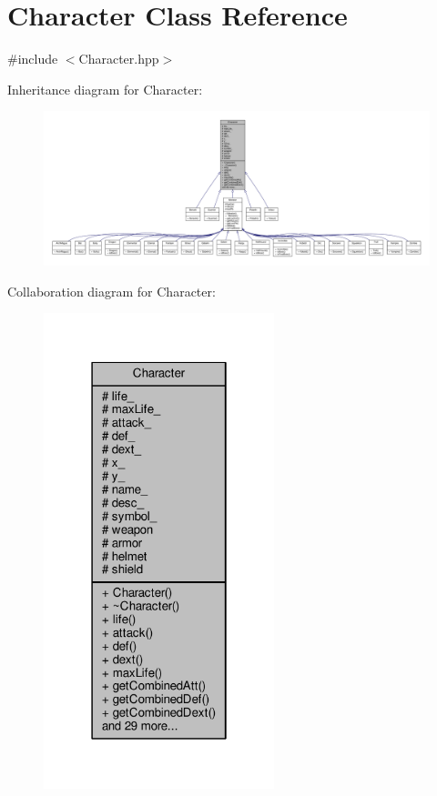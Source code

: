 \hypertarget{class_character}{\section{Character Class Reference}
\label{class_character}
}


{\ttfamily \#include $<$Character.\-hpp$>$}



Inheritance diagram for Character\-:
\nopagebreak
\begin{figure}[H]
\begin{center}
\leavevmode
\includegraphics[width=350pt]{class_character__inherit__graph}
\end{center}
\end{figure}


Collaboration diagram for Character\-:
\nopagebreak
\begin{figure}[H]
\begin{center}
\leavevmode
\includegraphics[width=190pt]{class_character__coll__graph}
\end{center}
\end{figure}
